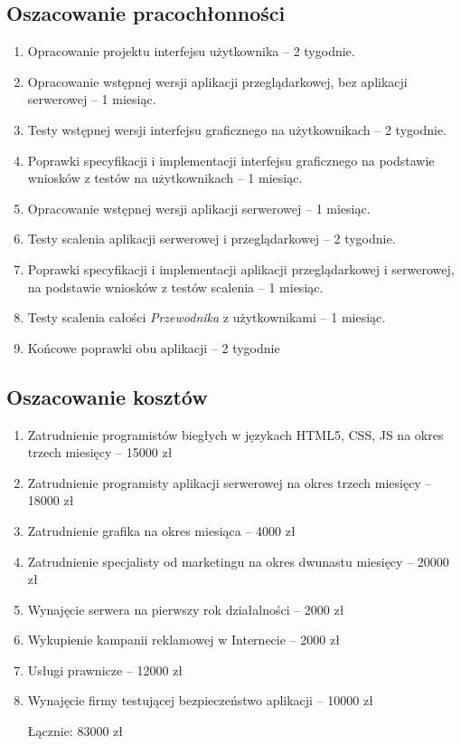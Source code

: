\documentclass[12pt,a4paper]{report}
\newcommand{\blankpage}{
\newpage
\thispagestyle{empty}
\mbox{}
\newpage
}
\begin{document}
\subsection{Oszacowanie pracochłonności}
\begin{enumerate}
	\item Opracowanie projektu interfejsu użytkownika -- 2 tygodnie.
	\item Opracowanie wstępnej wersji aplikacji przeglądarkowej, bez aplikacji serwerowej -- 1 miesiąc.
	\item Testy wstępnej wersji interfejsu graficznego na użytkownikach -- 2 tygodnie.
	\item Poprawki specyfikacji i implementacji interfejsu graficznego na podstawie wniosków z testów na użytkownikach -- 1 miesiąc.
	\item Opracowanie wstępnej wersji aplikacji serwerowej -- 1 miesiąc.
	\item Testy scalenia aplikacji serwerowej i przeglądarkowej -- 2 tygodnie.
	\item Poprawki specyfikacji i implementacji aplikacji przeglądarkowej i serwerowej, na podstawie wniosków z testów scalenia -- 1 miesiąc.
	\item Testy scalenia całości \emph{Przewodnika} z użytkownikami -- 1 miesiąc.
	\item Końcowe poprawki obu aplikacji -- 2 tygodnie 
\end{enumerate}
\subsection{Oszacowanie kosztów}
\begin{enumerate}
	\item Zatrudnienie programistów biegłych w językach HTML5, CSS, JS na okres trzech miesięcy -- 15000 zł
	\item Zatrudnienie programisty aplikacji serwerowej na okres trzech miesięcy -- 18000 zł
	\item Zatrudnienie grafika na okres miesiąca -- 4000 zł
	\item Zatrudnienie specjalisty od marketingu na okres dwunastu miesięcy -- 20000 zł
	\item Wynajęcie serwera na pierwszy rok działalności -- 2000 zł
	\item Wykupienie kampanii reklamowej w Internecie -- 2000 zł
	\item Usługi prawnicze -- 12000 zł
	\item Wynajęcie firmy testującej bezpieczeństwo aplikacji -- 10000 zł

Łącznie: 83000 zł
\end{enumerate}
\newpage
\blankpage
\end{document}
